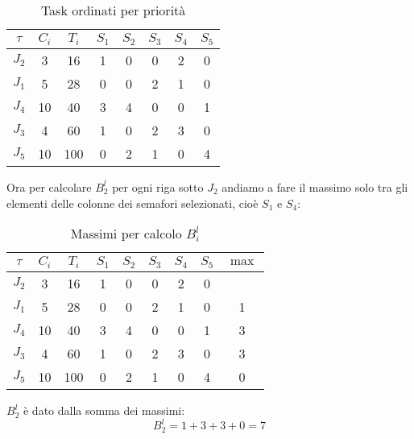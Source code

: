 \begin{Esercizio2}
\begin{table}[H]
\centering
\caption{Task ordinati per priorità}
\begin{tabular}{|c|c|c|c|c|c|c|c|}
\hline
\(\tau\) & $C_i$ & $T_i$ & $S_1$ & $S_2$ & $S_3$ & $S_4$ & $S_5$ \\
\hline
$J_2$ & 3 & 16 & 1 & 0 & 0 & 2 & 0 \\
\arrayrulecolor{red}\hline
\arrayrulecolor{black}
$J_1$ & 5 & 28 & \cellcolor{blue!20}0 & 0 & 2 & \cellcolor{blue!20}1 & 0 \\
\hline
$J_4$ & 10 & 40 & \cellcolor{blue!20}3 & 4 & 0 & \cellcolor{blue!20}0 & 1 \\
\hline
$J_3$ & 4 & 60 & \cellcolor{blue!20}1 & 0 & 2 & \cellcolor{blue!20}3 & 0 \\
\hline
$J_5$ & 10 & 100 & \cellcolor{blue!20}0 & 2 & 1 & \cellcolor{blue!20}0 & 4 \\
\hline
\end{tabular}
\label{tab:task_periodici_esercizio}
\end{table} 

Ora per calcolare \(B_{2}^{l}\) per ogni riga sotto 
\(J_{2}\) andiamo 
a fare il massimo solo tra gli elementi delle colonne
dei semafori selezionati, cioè \(S_{1}\) e \(S_{4}\):


\begin{table}[H]
\centering
\begin{tabular}{|c|c|c|c|c|c|c|c|c|}
\hline
\(\tau\) & $C_i$ & $T_i$ & $S_1$ & $S_2$ & $S_3$ & $S_4$ & $S_5$ & $\max$ \\
\hline
$J_2$ & 3 & 16 & 1 & 0 & 0 & 2 & 0 & \\
\arrayrulecolor{red}\hline
\arrayrulecolor{black}
$J_1$ & 5 & 28 & \cellcolor{blue!20}0 & 0 & 2 & \cellcolor{blue!20}1 & 0 & 1 \\
\hline
$J_4$ & 10 & 40 & \cellcolor{blue!20}3 & 4 & 0 & \cellcolor{blue!20}0 & 1 & 3 \\
\hline
$J_3$ & 4 & 60 & \cellcolor{blue!20}1 & 0 & 2 & \cellcolor{blue!20}3 & 0 & 3 \\
\hline
$J_5$ & 10 & 100 & \cellcolor{blue!20}0 & 2 & 1 & \cellcolor{blue!20}0 & 4 & 0 \\
\hline
\end{tabular}
\label{tab:task_periodici_esercizio}
\caption{Massimi per calcolo \(B_{i}^{l}\)}

\end{table}

\(B_{2}^{l}\) è dato dalla somma dei massimi:
\[ B_{2}^{l} = 1 + 3 + 3 + 0 = 7 \]





\end{Esercizio2}
